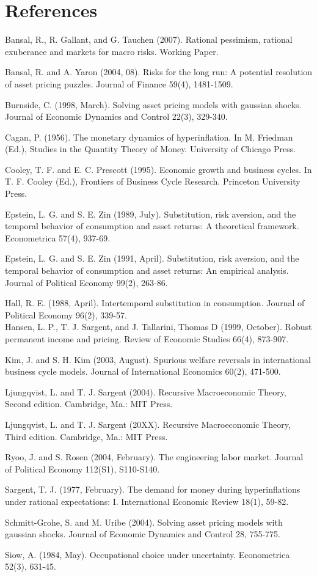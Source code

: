 \documentclass[10pt]{article}
\begin{document}
\section*{References}
Bansal, R., R. Gallant, and G. Tauchen (2007). Rational pessimism, rational exuberance and markets for macro risks. Working Paper.

Bansal, R. and A. Yaron (2004, 08). Risks for the long run: A potential resolution of asset pricing puzzles. Journal of Finance 59(4), 1481-1509.

Burnside, C. (1998, March). Solving asset pricing models with gaussian shocks. Journal of Economic Dynamics and Control 22(3), 329-340.

Cagan, P. (1956). The monetary dynamics of hyperinflation. In M. Friedman (Ed.), Studies in the Quantity Theory of Money. University of Chicago Press.

Cooley, T. F. and E. C. Prescott (1995). Economic growth and business cycles. In T. F. Cooley (Ed.), Frontiers of Business Cycle Research. Princeton University Press.

Epstein, L. G. and S. E. Zin (1989, July). Substitution, risk aversion, and the temporal behavior of consumption and asset returns: A theoretical framework. Econometrica 57(4), 937-69.

Epstein, L. G. and S. E. Zin (1991, April). Substitution, risk aversion, and the temporal behavior of consumption and asset returns: An empirical analysis. Journal of Political Economy 99(2), 263-86.

Hall, R. E. (1988, April). Intertemporal substitution in consumption. Journal of Political Economy 96(2), 339-57.\\
Hansen, L. P., T. J. Sargent, and J. Tallarini, Thomas D (1999, October). Robust permanent income and pricing. Review of Economic Studies 66(4), 873-907.

Kim, J. and S. H. Kim (2003, August). Spurious welfare reversals in international business cycle models. Journal of International Economics 60(2), 471-500.

Ljungqvist, L. and T. J. Sargent (2004). Recursive Macroeconomic Theory, Second edition. Cambridge, Ma.: MIT Press.

Ljungqvist, L. and T. J. Sargent (20XX). Recursive Macroeconomic Theory, Third edition. Cambridge, Ma.: MIT Press.

Ryoo, J. and S. Rosen (2004, February). The engineering labor market. Journal of Political Economy 112(S1), S110-S140.

Sargent, T. J. (1977, February). The demand for money during hyperinflations under rational expectations: I. International Economic Review 18(1), 59-82.

Schmitt-Grohe, S. and M. Uribe (2004). Solving asset pricing models with gaussian shocks. Journal of Economic Dynamics and Control 28, 755-775.

Siow, A. (1984, May). Occupational choice under uncertainty. Econometrica 52(3), 631-45.
\end{document}
